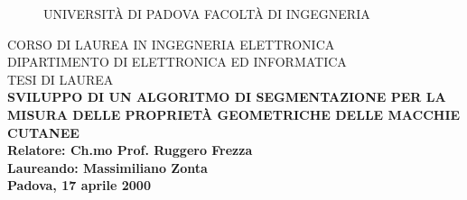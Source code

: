 
\pagestyle{empty}

\center
\begin{figure}
\epsfxsize=2cm
\centerline{
UNIVERSIT\`A DI PADOVA
\epsfysize 1.8cm 
FACOLT\`A DI INGEGNERIA
}
\end{figure}
CORSO DI LAUREA IN INGEGNERIA ELETTRONICA\\
DIPARTIMENTO DI ELETTRONICA ED INFORMATICA\\
\vspace{1.5cm}
\large 
TESI DI LAUREA\\
\vspace{2cm}
\Large \bf
SVILUPPO DI UN ALGORITMO DI SEGMENTAZIONE PER LA MISURA DELLE PROPRIET\`A GEOMETRICHE DELLE
MACCHIE CUTANEE\\
\large
\vspace{1.5cm}
Relatore: Ch.mo Prof. Ruggero Frezza \\
\vspace{.5cm}
Laureando: Massimiliano Zonta\\
\vfill
Padova, 17 aprile 2000 
\nocite{*}


